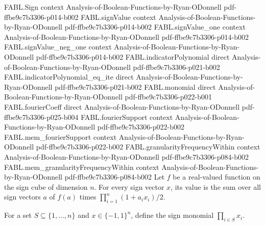 \begin{theorem}
\label{FABL.sum_indicatorPolynomial}
\leanok
{}
\proofstep
  {FABL.Sign}
  {context}
  {Analysis-of-Boolean-Functions-by-Ryan-ODonnell}
  {pdf-ffbe9c7b3306-p014-b002}
\proofstep
  {FABL.signValue}
  {context}
  {Analysis-of-Boolean-Functions-by-Ryan-ODonnell}
  {pdf-ffbe9c7b3306-p014-b002}
\proofstep
  {FABL.signValue_one}
  {context}
  {Analysis-of-Boolean-Functions-by-Ryan-ODonnell}
  {pdf-ffbe9c7b3306-p014-b002}
\proofstep
  {FABL.signValue_neg_one}
  {context}
  {Analysis-of-Boolean-Functions-by-Ryan-ODonnell}
  {pdf-ffbe9c7b3306-p014-b002}
\proofstep
  {FABL.indicatorPolynomial}
  {direct}
  {Analysis-of-Boolean-Functions-by-Ryan-ODonnell}
  {pdf-ffbe9c7b3306-p021-b002}
\proofstep
  {FABL.indicatorPolynomial_eq_ite}
  {direct}
  {Analysis-of-Boolean-Functions-by-Ryan-ODonnell}
  {pdf-ffbe9c7b3306-p021-b002}
\proofstep
  {FABL.monomial}
  {direct}
  {Analysis-of-Boolean-Functions-by-Ryan-ODonnell}
  {pdf-ffbe9c7b3306-p022-b001}
\proofstep
  {FABL.fourierCoeff}
  {direct}
  {Analysis-of-Boolean-Functions-by-Ryan-ODonnell}
  {pdf-ffbe9c7b3306-p025-b004}
\proofstep
  {FABL.fourierSupport}
  {context}
  {Analysis-of-Boolean-Functions-by-Ryan-ODonnell}
  {pdf-ffbe9c7b3306-p022-b002}
\proofstep
  {FABL.mem_fourierSupport}
  {context}
  {Analysis-of-Boolean-Functions-by-Ryan-ODonnell}
  {pdf-ffbe9c7b3306-p022-b002}
\proofstep
  {FABL.granularityFrequencyWithin}
  {context}
  {Analysis-of-Boolean-Functions-by-Ryan-ODonnell}
  {pdf-ffbe9c7b3306-p084-b002}
\proofstep
  {FABL.mem_granularityFrequencyWithin}
  {context}
  {Analysis-of-Boolean-Functions-by-Ryan-ODonnell}
  {pdf-ffbe9c7b3306-p084-b002}
Let $f$ be a real-valued function on the sign cube of dimension $n$. For every sign
vector $x$, its value is the sum over all sign vectors $a$ of $f(a)$ times
$\prod_{i=1}^n (1+a_i x_i)/2$.
\end{theorem}

\begin{definition}
\label{FABL.monomial}
\leanok
{}
For a set $S\subseteq\{1,\ldots,n\}$ and $x\in\{-1,1\}^n$, define the sign monomial
$\prod_{i\in S}x_i$.
\end{definition}

